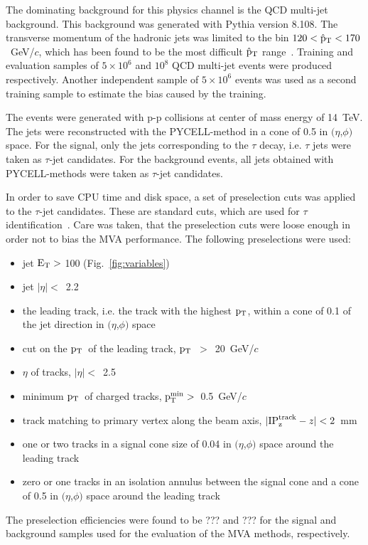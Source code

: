 \documentclass[a4paper]{jpconf}
\newcommand{\pT}{\mbox{${\rm p}_{\rm T}$}}
\begin{document}
The dominating background for this physics channel is the QCD
multi-jet background. This background was generated with 
Pythia version 8.108. The transverse momentum of the hadronic jets was
limited to the bin $120 < \hat{\rm p}_{\rm T} < 170$~GeV/$c$, which
has been found to be the most difficult $\hat{\rm p}_{\rm T}$
range~\cite{ptdrII}. Training and evaluation samples of $5\times 10^6$
and $10^8$ QCD multi-jet events were produced respectively. Another
independent sample of $5\times 10^6$ events was used as a second
training sample to estimate the bias caused by the training.

The events were generated with p-p collisions at center of mass energy
of 14~TeV. The jets were reconstructed with the PYCELL-method in a
cone of 0.5 in $(\eta$,$\phi)$ space. For the signal, only the jets
corresponding to the $\tau$ decay, i.e. $\tau$ jets were taken as
$\tau$-jet candidates. For the background events, all jets obtained
with PYCELL-methods were taken as $\tau$-jet candidates.

In order to save CPU time and disk space, a set of preselection cuts
was applied to the $\tau$-jet candidates. These are standard cuts,
which are used for $\tau$ identification~\cite{tautagging}. Care was
taken, that the preselection cuts were loose enough in order not to
bias the MVA performance. The following preselections were used:
\begin{itemize}
\item jet ${\rm E}_{\rm T} >$ 100 (Fig.~\ref{fig:variables})
\item jet $|\eta|<$~2.2 
\item the leading track, i.e. the track with the highest \pT, within a
  cone of 0.1 of the jet direction in $(\eta$,$\phi)$ space
\item cut on the \pT\ of the leading track, \pT~$>$~20~GeV/$c$
\item $\eta$ of tracks, $|\eta|<$~2.5
\item minimum \pT\ of charged tracks,
  ${\rm p}_{\rm T}^{\rm min} >$~0.5~GeV/$c$
\item track matching to primary vertex along the beam axis, $|{\rm
  IP}_{\rm z}^{\rm track}-z|<2$~mm
\item one or two tracks in a signal cone size of 0.04 in $(\eta$,$\phi)$
  space around the leading track
\item zero or one tracks in an isolation annulus between the signal
  cone and a cone of 0.5 in $(\eta$,$\phi)$ space around the leading track 
\end{itemize} 
The preselection efficiencies were found to be ??? and ??? for the
signal and background samples used for the evaluation of the MVA
methods, respectively.
\end{document}
